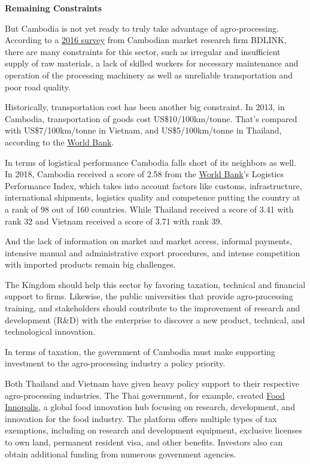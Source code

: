\documentclass[10pt,a4paper]{letter}
\begin{document}
\textbf{Remaining Constraints}

But Cambodia is not yet ready to truly take advantage of agro-processing. According to a \href{http://www.ukabc.org.uk/wp-content/uploads/2017/04/AgriProject_Reporting_FINAL-VERSION-copy.pdf}{2016 survey} from Cambodian market research firm BDLINK, there are many constraints for this sector, such as irregular and insufficient supply of raw materials, a lack of skilled workers for necessary maintenance and operation of the processing machinery as well as unreliable transportation and poor road quality.

Historically, transportation cost has been another big constraint. In 2013, in Cambodia, transportation of goods cost US\$10/100km/tonne. That's compared with US\$7/100km/tonne in Vietnam, and US\$5/100km/tonne in Thailand, according to the \href{https://www.worldbank.org/en/country/cambodia/publication/cambodian-agriculture-in-transition-opportunities-and-risks}{World Bank}. 

In terms of logistical performance Cambodia falls short of its neighbors as well. In 2018, Cambodia received a score of 2.58 from the \href{https://lpi.worldbank.org/international/scorecard/radar/254/C/KHM/2018}{World Bank}'s Logistics Performance Index, which takes into account factors like customs, infrastructure, international shipments, logistics quality and competence putting the country at a rank of 98 out of 160 countries. While Thailand received a score of 3.41 with rank 32 and Vietnam received a score of 3.71 with rank 39.

And the lack of information on market and market access, informal payments, intensive manual and administrative export procedures, and intense competition with imported products remain big challenges.

The Kingdom should help this sector by favoring taxation, technical and financial support to firms. Likewise, the public universities that provide agro-processing training, and stakeholders should contribute to the improvement of research and development (R\&D) with the enterprise to discover a new product, technical, and technological innovation.

In terms of taxation, the government of Cambodia must make supporting investment to the agro-processing industry a policy priority.

Both Thailand and Vietnam have given heavy policy support to their respective agro-processing industries. The Thai government, for example, created \href{http://foodinnopolis.or.th/en/home/}{Food Innopolis}, a global food innovation hub focusing on research, development, and innovation for the food industry. The platform offers multiple types of tax exemptions, including on research and development equipment, exclusive licenses to own land, permanent resident visa, and other benefits. Investors also can obtain additional funding from numerous government agencies.
\end{document}
